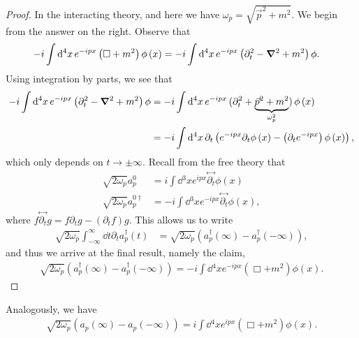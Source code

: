 \begin{proof}
    In the interacting theory, and here we have $\omega_p = \sqrt{\vec{p}^2 + m^2} $. We begin from the answer on the right. Observe that
    \begin{align}
        -i \int \dd{^{4}x} e^{-i px} \left( \Box + m^2 \right) \phi \left( x \right) &= -i \int \dd{^{4}x} e^{-i p x} \left( \partial_t^2 - \grad^2 + m^2 \right)\phi
    .\end{align}
    Using integration by parts, we see that
    \begin{align}
        -i \int \dd{^{4}x} e^{-i p x} \left( \partial_t^2 - \grad^2 + m^2 \right)\phi &= -i \int \dd{^{4}x} e^{-i px}\, ( \partial_t^2 + \underbrace{\vec{p}^2 + m^2}_{\omega_p^2} ) \,\phi \left( x \right) \\
       &= -i \int \dd{^{4}x} \partial_t \left( e^{-i p x} \partial_t \phi \left( x \right) - \left( \partial_t e^{-i p x} \right) \phi \left( x \right)  \right) 
    ,\end{align}
    which only depends on $t \to \pm \infty$.
    Recall from the free theory that
    \begin{align}
        \sqrt{2 \omega_p}  a^{0}_p &= i \int \dd{^3x} e^{ipx} \overset{\leftrightarrow}{\partial_t} \phi \left( x \right)  \\
        \sqrt{2 \omega_p}  a^{0\dagger}_p &= -i \int \dd{^3x} e^{-ipx} \overset{\leftrightarrow}{\partial_t} \phi \left( x \right)
    ,\end{align}
    where $f \overset{\leftrightarrow}{\partial_t} g = f \partial_t g - \left( \partial_t f \right) g$.
    This allows us to write
    \begin{align}
        \sqrt{2 \omega_p}  \int_{-\infty}^{\infty} \dd{t} \partial_t a_p^{\dag} \left( t \right) &= \sqrt{2 \omega_p} \left( a_p^{\dag} \left( \infty \right) - a_p^{\dag} \left( - \infty \right)  \right)
    ,\end{align}
    and thus we arrive at the final result, namely the claim,
    \begin{align}
        \sqrt{2 \omega_p}  \left( a_p^{\dag} \left( \infty \right) - a^{\dag}_p \left( - \infty \right)  \right) = -i \int \dd{^{4}x} e^{-i p x} \left( \Box + m^2 \right) \phi \left( x \right) 
    .\end{align}

\end{proof}

Analogously, we have
\begin{align}
    \sqrt{2 \omega_p}  \left( a_p \left( \infty \right) - a_p \left( -\infty \right)  \right) = i \int \dd{^{4}x} e^{ipx} \left( \Box + m^2 \right) \phi \left( x \right) 
.\end{align}

